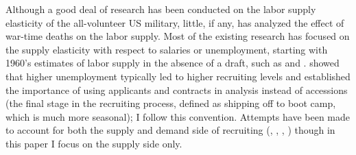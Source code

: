 \documentclass[12pt] {article}
\begin{document}
Although a good deal of research has been conducted on the labor supply
elasticity of the all-volunteer US military, little, if any, has analyzed
the effect of war-time deaths on the labor supply. Most of the existing
research has focused on the supply elasticity with respect to salaries or unemployment, starting with 1960's estimates of labor supply in the absence of a draft, such as
\cite{Altman-Fechter-AER-1967} and \cite{Altman-JHR-1969}. \cite{Dale-Gilroy-AER-Note-1985} showed that higher unemployment typically led to higher recruiting levels and established the importance of using applicants and contracts in analysis instead of accessions (the final stage in the recruiting process, defined as shipping off
to boot camp, which is much more seasonal); I follow this convention. %
Attempts have been made to account for both the supply and demand side of recruiting (\cite{Dertouzos-RAND-1985}, \cite{Hanssens-Levien-Advertising}, \cite{Dertouzous-Polich-Army-Ads}, \cite{Asch-Incentives}) though in this paper I focus on the supply side only.

\end{document}
